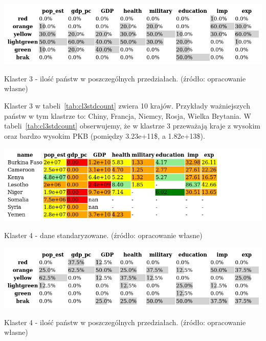 \documentclass[11pt]{report}
\begin{document}
    \begin{table}[!htp]
        \centering
        \includegraphics[width=\linewidth]{tables/CLUST/cluster3stdkmeanscount.png}
        \caption{Klaster 3 - ilość państw w poszczególnych przedziałach. (źródło: opracowanie własne)}
        \label{tab:cl3stdcount}
    \end{table}

    Klaster 3 w tabeli~\ref{tab:cl3stdcount} zwiera 10 krajów.
    Przykłady ważniejszych państw w tym klastrze to: Chiny, Francja, Niemcy, Rosja, Wielka Brytania.
    W tabeli~\ref{tab:cl3stdcount} obserwujemy, że w klastrze 3 przeważają kraje z wysokim oraz bardzo wysokim PKB (pomiędzy 3.23e+11\$, a 1.82e+13\$).

    \begin{table}[!htp]
        \centering
        \includegraphics[width=\linewidth]{tables/CLUST/cluster4stdkmeans.png}
        \caption{Klaster 4 - dane standaryzowane. (źródło: opracowanie własne)}
        \label{tab:cl4std}
    \end{table}

    \begin{table}[!htp]
        \centering
        \includegraphics[width=\linewidth]{tables/CLUST/cluster4stdkmeanscount.png}
        \caption{Klaster 4 - ilość państw w poszczególnych przedziałach. (źródło: opracowanie własne)}
        \label{tab:cl4stdcount}
    \end{table}
\end{document}
